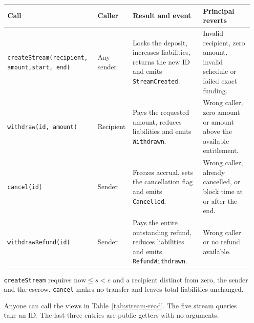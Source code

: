 \documentclass[12pt,a4paper]{report}
\begin{document}
\noindent\begin{minipage}{\linewidth}
\small
{}
\label{tab:stream-write}
\setlength{\tabcolsep}{5pt}
\begin{tabularx}{\linewidth}{@{}P{4.10cm}P{1.60cm}Y Y@{}}
\toprule
Call & Caller & Result and event & Principal reverts\\\midrule
\texttt{createStream}\newline\texttt{(recipient, amount,}\newline\texttt{start, end)}
  & Any sender
  & Locks the deposit, increases liabilities, returns the new ID and emits \texttt{StreamCreated}.
  & Invalid recipient, zero amount, invalid schedule or failed exact funding.\\
\addlinespace
\texttt{withdraw(id, amount)}
  & Recipient
  & Pays the requested amount, reduces liabilities and emits \texttt{Withdrawn}.
  & Wrong caller, zero amount or amount above the available entitlement.\\
\addlinespace
\texttt{cancel(id)}
  & Sender
  & Freezes accrual, sets the cancellation flag and emits \texttt{Cancelled}.
  & Wrong caller, already cancelled, or block time at or after the end.\\
\addlinespace
\texttt{withdrawRefund(id)}
  & Sender
  & Pays the entire outstanding refund, reduces liabilities and emits \texttt{RefundWithdrawn}.
  & Wrong caller or no refund available.\\
\bottomrule
\end{tabularx}
\end{minipage}

\texttt{createStream} requires $\mathrm{now}\leq s<e$ and a recipient distinct from zero, the sender and the escrow. \texttt{cancel} makes no transfer and leaves total liabilities unchanged.

Anyone can call the views in Table~\ref{tab:stream-read}. The five stream queries take an ID. The last three entries are public getters with no arguments.
\end{document}
